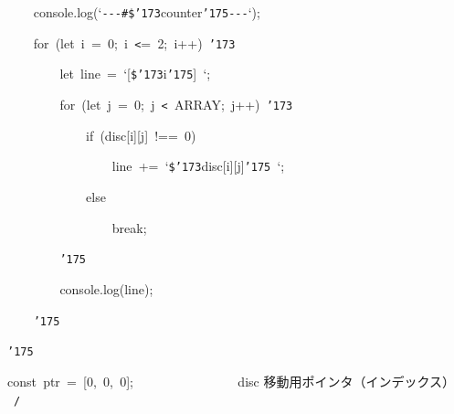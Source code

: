\documentclass[a4paper,10pt]{article}
\def\mc{\relax}
\begin{document}
\noindent
\mbox{}{\tt\mc \ }{\tt\mc \ }{\tt\mc \ }{\tt\mc \ }console.log(`{\tt -}{\tt -}{\tt -}{\tt\#}{\tt\$}{\tt\char'173}counter{\tt\char'175}{\tt -}{\tt -}{\tt -}`);

\noindent
\mbox{}{\tt\mc \ }{\tt\mc \ }{\tt\mc \ }{\tt\mc \ }for{\tt\mc \ }(let{\tt\mc \ }i{\tt\mc \ }={\tt\mc \ }0;{\tt\mc \ }i{\tt\mc \ }{\tt <}={\tt\mc \ }2;{\tt\mc \ }i++){\tt\mc \ }{\tt\char'173}

\noindent
\mbox{}{\tt\mc \ }{\tt\mc \ }{\tt\mc \ }{\tt\mc \ }{\tt\mc \ }{\tt\mc \ }{\tt\mc \ }{\tt\mc \ }let{\tt\mc \ }line{\tt\mc \ }={\tt\mc \ }`[{\tt\$}{\tt\char'173}i{\tt\char'175}]{\tt\mc \ }`;

\noindent
\mbox{}{\tt\mc \ }{\tt\mc \ }{\tt\mc \ }{\tt\mc \ }{\tt\mc \ }{\tt\mc \ }{\tt\mc \ }{\tt\mc \ }for{\tt\mc \ }(let{\tt\mc \ }j{\tt\mc \ }={\tt\mc \ }0;{\tt\mc \ }j{\tt\mc \ }{\tt <}{\tt\mc \ }ARRAY;{\tt\mc \ }j++){\tt\mc \ }{\tt\char'173}

\noindent
\mbox{}{\tt\mc \ }{\tt\mc \ }{\tt\mc \ }{\tt\mc \ }{\tt\mc \ }{\tt\mc \ }{\tt\mc \ }{\tt\mc \ }{\tt\mc \ }{\tt\mc \ }{\tt\mc \ }{\tt\mc \ }if{\tt\mc \ }(disc[i][j]{\tt\mc \ }!=={\tt\mc \ }0)

\noindent
\mbox{}{\tt\mc \ }{\tt\mc \ }{\tt\mc \ }{\tt\mc \ }{\tt\mc \ }{\tt\mc \ }{\tt\mc \ }{\tt\mc \ }{\tt\mc \ }{\tt\mc \ }{\tt\mc \ }{\tt\mc \ }{\tt\mc \ }{\tt\mc \ }{\tt\mc \ }{\tt\mc \ }line{\tt\mc \ }+={\tt\mc \ }`{\tt\$}{\tt\char'173}disc[i][j]{\tt\char'175}{\tt\mc \ }`;

\noindent
\mbox{}{\tt\mc \ }{\tt\mc \ }{\tt\mc \ }{\tt\mc \ }{\tt\mc \ }{\tt\mc \ }{\tt\mc \ }{\tt\mc \ }{\tt\mc \ }{\tt\mc \ }{\tt\mc \ }{\tt\mc \ }else

\noindent
\mbox{}{\tt\mc \ }{\tt\mc \ }{\tt\mc \ }{\tt\mc \ }{\tt\mc \ }{\tt\mc \ }{\tt\mc \ }{\tt\mc \ }{\tt\mc \ }{\tt\mc \ }{\tt\mc \ }{\tt\mc \ }{\tt\mc \ }{\tt\mc \ }{\tt\mc \ }{\tt\mc \ }break;

\noindent
\mbox{}{\tt\mc \ }{\tt\mc \ }{\tt\mc \ }{\tt\mc \ }{\tt\mc \ }{\tt\mc \ }{\tt\mc \ }{\tt\mc \ }{\tt\char'175}

\noindent
\mbox{}{\tt\mc \ }{\tt\mc \ }{\tt\mc \ }{\tt\mc \ }{\tt\mc \ }{\tt\mc \ }{\tt\mc \ }{\tt\mc \ }console.log(line);

\noindent
\mbox{}{\tt\mc \ }{\tt\mc \ }{\tt\mc \ }{\tt\mc \ }{\tt\char'175}

\noindent
\mbox{}{\tt\char'175}

\noindent
\mbox{}\hfill

\noindent
\mbox{}const{\tt\mc \ }ptr{\tt\mc \ }={\tt\mc \ }[0,{\tt\mc \ }0,{\tt\mc \ }0];{\tt\mc \ }{\tt\mc \ }{\tt\mc \ }{\tt\mc \ }{\tt\mc \ }{\tt\mc \ }{\tt\mc \ }{\tt\mc \ }{\tt\mc \ }{\tt\mc \ }{\tt\mc \ }{\tt\mc \ }{\tt\mc \ }{\tt\mc \ }\rm\mc {\tt /}{\tt *}\  \ disc 移動用ポインタ（インデックス） \hfill \rm\mc \ {\tt *}{\tt /}
\tt\mc 
\end{document}
